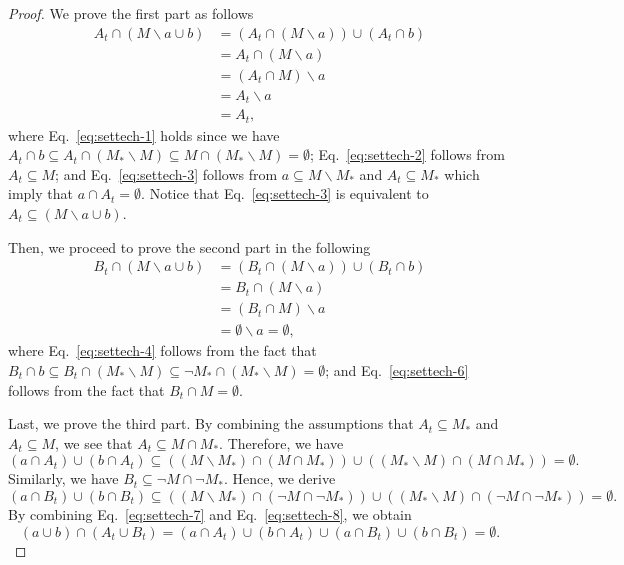\documentclass{article}
\newcommand{\del}{\backslash}
\begin{document}
\begin{proof}
We prove the first part as follows
\begin{align}
A_t \cap (M \del a \cup b) &= 
(A_t \cap (M \del a)) \cup (A_t \cap b) \nonumber \\
&= A_t \cap (M \del a) \label{eq:settech-1}\\
&= (A_t \cap M) \del a \nonumber \\
&= A_t \del a \label{eq:settech-2} \\
&= A_t\label{eq:settech-3},
\end{align}
where Eq.~\eqref{eq:settech-1} holds since we have $A_t\cap b \subseteq A_t \cap (M_* \del M) \subseteq M \cap (M_*\del M) = \emptyset$;
Eq.~\eqref{eq:settech-2} follows from $A_t \subseteq M$;
and Eq.~\eqref{eq:settech-3} follows from $a\subseteq M\del M_*$ and $A_t \subseteq M_*$ which imply that $a\cap A_t = \emptyset$.
Notice that Eq.~\eqref{eq:settech-3} is equivalent to $A_t \subseteq (M \del a \cup b)$.

Then, we proceed to prove the second part in the following
\begin{align}
B_t \cap (M \del a \cup b )
&= 
(B_t \cap (M \del a)) \cup (B_t \cap b) \nonumber\\
&=
B_t \cap (M \del a) \label{eq:settech-4}\\
&=
(B_t \cap M) \del a \nonumber\\
&= \emptyset \del a = \emptyset,\label{eq:settech-6}
\end{align}
where Eq.~\eqref{eq:settech-4} follows from the fact that $B_t\cap b \subseteq B_t \cap (M_*\del M) \subseteq \neg M_* \cap (M_* \del M) = \emptyset$; and 
Eq.~\eqref{eq:settech-6} follows from the fact that $B_t\cap M =\emptyset$.

Last, we prove the third part. 
By combining the assumptions that $A_t\subseteq M_*$ and $A_t\subseteq M$,
we see that $A_t \subseteq M \cap M_*$.
Therefore, we have 
\begin{equation}
\label{eq:settech-7}
(a \cap A_t) \cup (b\cap A_t) \subseteq ( (M\del M_*) \cap (M \cap M_*)) \cup ((M_* \del M) \cap (M \cap M_*)) = \emptyset.
\end{equation}
Similarly, we have $B_t \subseteq \neg M \cap \neg M_*$. Hence, we derive
\begin{equation}
\label{eq:settech-8}
(a \cap B_t) \cup (b\cap B_t) \subseteq ( (M\del M_*) \cap (\neg M \cap  \neg M_*)) \cup ((M_* \del M) \cap (\neg M \cap \neg M_*)) = \emptyset.
\end{equation}
By combining Eq.~\eqref{eq:settech-7} and Eq.~\eqref{eq:settech-8}, we obtain
$$
(a\cup b) \cap (A_t \cup B_t) = (a\cap A_t) \cup (b\cap A_t) \cup (a \cap B_t) \cup (b\cap B_t) = \emptyset.
$$
\end{proof}
\end{document}
